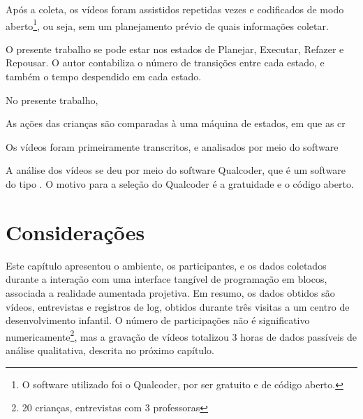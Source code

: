 Após a coleta, os vídeos foram assistidos repetidas vezes e codificados de modo aberto\footnote{O software utilizado foi o Qualcoder, por ser gratuito e de código aberto.}, ou seja, sem um planejamento prévio de quais informações coletar. 


O presente trabalho se pode estar nos estados de Planejar, Executar, Refazer e Repousar. O autor contabiliza o número de transições entre cada estado, e também o tempo despendido em cada estado. 

No presente trabalho, 

As ações das crianças são comparadas à uma máquina de estados, em que as cr

Os vídeos foram primeiramente transcritos, e analisados por meio do software 

A análise dos vídeos se deu por meio do software Qualcoder, que é um software do tipo . O motivo para a seleção do Qualcoder é a gratuidade e o código aberto.

\section{Considerações}

Este capítulo apresentou o ambiente, os participantes, e os dados coletados durante a interação com uma interface tangível de programação em blocos, associada a realidade aumentada projetiva. Em resumo, os dados obtidos são vídeos, entrevistas e registros de log, obtidos durante três visitas a um centro de desenvolvimento infantil. O número de participações não é significativo numericamente\footnote{20 crianças, entrevistas com 3 professoras}, mas a gravação de vídeos totalizou 3 horas de dados passíveis de análise qualitativa, descrita no próximo capítulo.